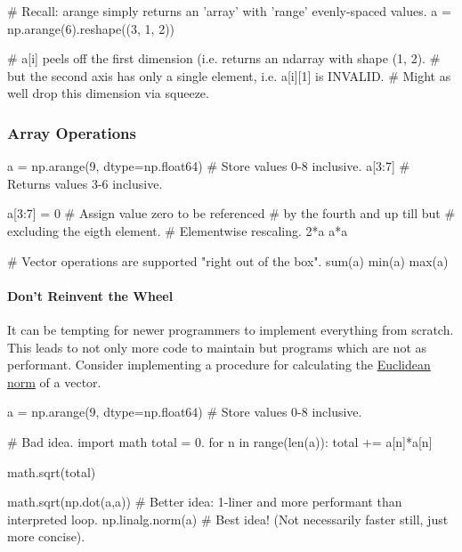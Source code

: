 \documentclass[12pt,letterpaper,twoside]{article}
\begin{document}
\begin{python}
# Recall: arange simply returns an 'array' with 'range' evenly-spaced values.
a = np.arange(6).reshape((3, 1, 2))

# a[i] peels off the first dimension (i.e. returns an ndarray with shape (1, 2).
# but the second axis has only a single element, i.e. a[i][1] is INVALID. 
# Might as well drop this dimension via squeeze.
\end{python}

\subsubsection{Array Operations}

\begin{python}
a = np.arange(9, dtype=np.float64)   # Store values 0-8 inclusive.
a[3:7]                               # Returns values 3-6 inclusive.

a[3:7] = 0                           # Assign value zero to be referenced 
                                     # by the fourth and up till but
                                     # excluding the eigth element.
# Elementwise rescaling.
2*a
a*a

# Vector operations are supported "right out of the box".
sum(a)
min(a)
max(a)
\end{python}

\paragraph{Don't Reinvent the Wheel} It can be tempting for newer
programmers to implement everything from scratch. This leads to not
only more code to maintain but programs which are not as
performant. Consider implementing a procedure for calculating the 
\href{https://en.wikipedia.org/wiki/Norm_(mathematics)\#Euclidean_norm}
{Euclidean norm} of a vector.

\begin{python}
a = np.arange(9, dtype=np.float64)   # Store values 0-8 inclusive.

# Bad idea.
import math
total = 0.
for n in range(len(a)):
    total += a[n]*a[n]

math.sqrt(total)

math.sqrt(np.dot(a,a))  # Better idea: 1-liner and more performant than interpreted loop.
np.linalg.norm(a)       # Best idea! (Not necessarily faster still, just more concise).
\end{python}
\end{document}
